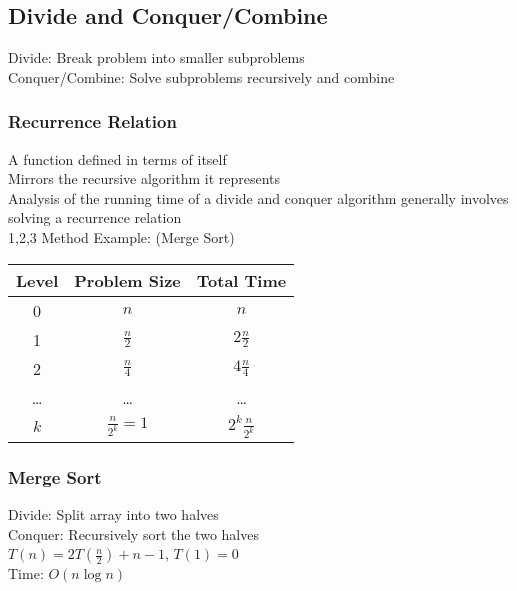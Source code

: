 \documentclass{article}
\begin{document}
\begin{multicols*}{2}
        \subsection*{Divide and Conquer/Combine}
        Divide: Break problem into smaller subproblems\\
        Conquer/Combine: Solve subproblems recursively and combine
        \subsubsection*{Recurrence Relation}
        A function defined in terms of itself\\
        Mirrors the recursive algorithm it represents\\
        Analysis of the running time of a divide and conquer algorithm generally involves
        solving a recurrence relation\\
        1,2,3 Method Example: (Merge Sort)\\
        \begin{tabular}{c|c|c}
            Level & Problem Size & Total Time \\
            \hline
            0 & $n$ & $n$ \\
            1 & $\frac{n}{2}$ & $2\frac{n}{2}$ \\
            2 & $\frac{n}{4}$ & $4\frac{n}{4}$ \\
            \ldots & \ldots & \ldots \\
            $k$ & $\frac{n}{2^k} = 1$ & $2^{k}\frac{n}{2^k}$ \\
        \end{tabular}
        \subsubsection*{Merge Sort}
        Divide: Split array into two halves\\
        Conquer: Recursively sort the two halves\\
        $T(n) = 2T(\frac{n}{2}) + n - 1$, $T(1) = 0$\\
        Time: $O(n\log n)$
    \end{multicols*}
\end{document}
